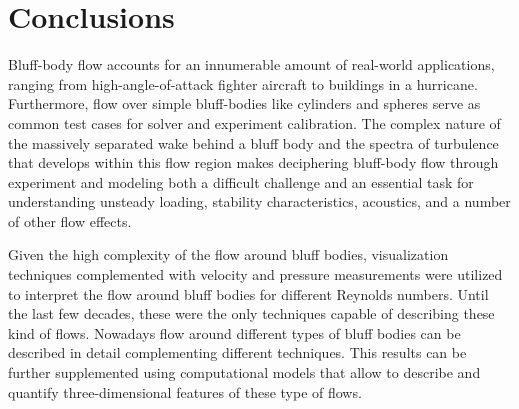\documentclass[journal]{new-aiaa}
\begin{document}


















\section{Conclusions}

Bluff-body flow accounts for an innumerable amount of real-world applications, ranging from high-angle-of-attack fighter aircraft to buildings in a hurricane. Furthermore, flow over simple bluff-bodies like cylinders and spheres serve as common test cases for solver and experiment calibration. The complex nature of the massively separated wake behind a bluff body and the spectra of turbulence that develops within this flow region makes deciphering bluff-body flow through experiment and modeling both a difficult challenge and an essential task for understanding unsteady loading, stability characteristics, acoustics, and a number of other flow effects.

Given the high complexity of the flow around bluff bodies, visualization techniques complemented with velocity and pressure measurements were utilized to interpret the flow around bluff bodies for different Reynolds numbers. Until the last few decades, these were the only techniques capable of describing these kind of flows. Nowadays flow around different types of bluff bodies can be described in detail complementing different techniques. This results can be further supplemented using computational models that allow to describe and quantify three-dimensional features of these type of flows.   
\end{document}
